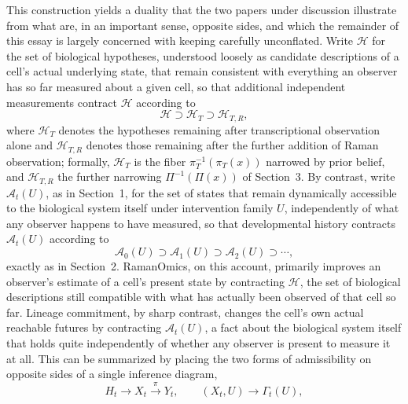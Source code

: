 \documentclass[11pt]{article}
\begin{document}
This construction yields a duality that the two papers under discussion illustrate from what are, in an important sense, opposite sides, and which the remainder of this essay is largely concerned with keeping carefully unconflated. Write $\mathcal{H}$ for the set of biological hypotheses, understood loosely as candidate descriptions of a cell's actual underlying state, that remain consistent with everything an observer has so far measured about a given cell, so that additional independent measurements contract $\mathcal{H}$ according to
\begin{equation}
\mathcal{H} \supset \mathcal{H}_T \supset \mathcal{H}_{T,R},
\end{equation}
where $\mathcal{H}_T$ denotes the hypotheses remaining after transcriptional observation alone and $\mathcal{H}_{T,R}$ denotes those remaining after the further addition of Raman observation; formally, $\mathcal{H}_T$ is the fiber $\pi_T^{-1}(\pi_T(x))$ narrowed by prior belief, and $\mathcal{H}_{T,R}$ the further narrowing $\Pi^{-1}(\Pi(x))$ of Section~3. By contrast, write $\mathcal{A}_t(U)$, as in Section~1, for the set of states that remain dynamically accessible to the biological system itself under intervention family $U$, independently of what any observer happens to have measured, so that developmental history contracts $\mathcal{A}_t(U)$ according to
\begin{equation}
\mathcal{A}_0(U) \supset \mathcal{A}_1(U) \supset \mathcal{A}_2(U) \supset \cdots,
\end{equation}
exactly as in Section~2. RamanOmics, on this account, primarily improves an observer's estimate of a cell's present state by contracting $\mathcal{H}$, the set of biological descriptions still compatible with what has actually been observed of that cell so far. Lineage commitment, by sharp contrast, changes the cell's own actual reachable futures by contracting $\mathcal{A}_t(U)$, a fact about the biological system itself that holds quite independently of whether any observer is present to measure it at all. This can be summarized by placing the two forms of admissibility on opposite sides of a single inference diagram,
\begin{equation}
H_t \longrightarrow X_t \xrightarrow{\ \pi\ } Y_t, \qquad (X_t, U) \longrightarrow \Gamma_t(U),
\end{equation}
\end{document}
